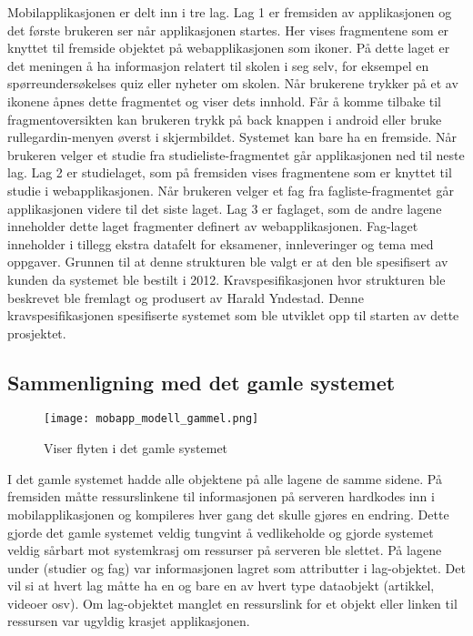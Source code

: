\documentclass[../main.tex]{subfiles}
\begin{document}
Mobilapplikasjonen er delt inn i tre lag. Lag 1 er fremsiden av applikasjonen og det første brukeren ser når applikasjonen startes. Her vises fragmentene som er knyttet til fremside objektet på webapplikasjonen som ikoner. På dette laget er det meningen å ha informasjon relatert til skolen i seg selv, for eksempel en spørreundersøkelses quiz eller nyheter om skolen. Når brukerene trykker på et av ikonene åpnes dette fragmentet og viser dets innhold. Får å komme tilbake til fragmentoversikten kan brukeren trykk på back knappen i android eller bruke rullegardin-menyen øverst i skjermbildet. Systemet kan bare ha en fremside.\newline
\newline
Når brukeren velger et studie fra studieliste-fragmentet går applikasjonen ned til neste lag. Lag 2 er studielaget, som på fremsiden vises fragmentene som er knyttet til studie i webapplikasjonen.\newline
\newline
Når brukeren velger et fag fra fagliste-fragmentet går applikasjonen videre til det siste laget. Lag 3 er faglaget, som de andre lagene inneholder dette laget fragmenter definert av webapplikasjonen. Fag-laget inneholder i tillegg ekstra datafelt for eksamener, innleveringer og tema med oppgaver.\newline
\newline
Grunnen til at denne strukturen ble valgt er at den ble spesifisert av kunden da systemet ble bestilt i 2012. Kravspesifikasjonen hvor strukturen ble beskrevet ble fremlagt og produsert av Harald Yndestad. Denne kravspesifikasjonen spesifiserte systemet som ble utviklet opp til starten av dette prosjektet.\newline

\subsection{Sammenligning med det gamle systemet}

\begin{figure}[H]
  \centering
  \texttt{[image: mobapp\_modell\_gammel.png]}
  \caption{Viser flyten i det gamle systemet}
\end{figure}

I det gamle systemet hadde alle objektene på alle lagene de samme sidene. På fremsiden måtte ressurslinkene til informasjonen på serveren hardkodes inn i mobilapplikasjonen og kompileres hver gang det skulle gjøres en endring. Dette gjorde det gamle systemet veldig tungvint å vedlikeholde og gjorde systemet veldig sårbart mot systemkrasj om ressurser på serveren ble slettet. På lagene under (studier og fag) var informasjonen lagret som attributter i lag-objektet. Det vil si at hvert lag måtte ha en og bare en av hvert type dataobjekt (artikkel, videoer osv). Om lag-objektet manglet en ressurslink for et objekt eller linken til ressursen var ugyldig krasjet applikasjonen.
\end{document}
